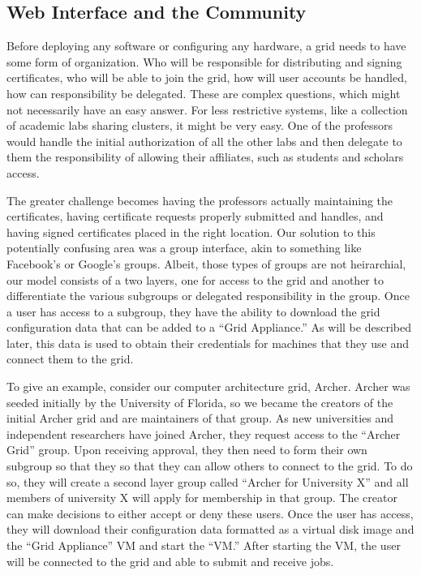 \documentclass[conference]{IEEEtran}
\begin{document}
\subsection{Web Interface and the Community}

Before deploying any software or configuring any hardware, a grid needs to have
some form of organization.  Who will be responsible for distributing and
signing certificates, who will be able to join the grid, how will user accounts
be handled, how can responsibility be delegated.  These are complex questions,
which might not necessarily have an easy answer.  For less restrictive systems,
like a collection of academic labs sharing clusters, it might be very easy.
One of the professors would handle the initial authorization of all the other
labs and then delegate to them the responsibility of allowing their affiliates,
such as students and scholars access.

The greater challenge becomes having the professors actually maintaining the
certificates, having certificate requests properly submitted and handles, and
having signed certificates placed in the right location.  Our solution to this
potentially confusing area was a group interface, akin to something like
Facebook's or Google's groups.  Albeit, those types of groups are not
heirarchial, our model consists of a two layers, one for access to the grid and
another to differentiate the various subgroups or delegated responsibility in
the group.  Once a user has access to a subgroup, they have the ability to
download the grid configuration data that can be added to a ``Grid Appliance.''
As will be described later, this data is used to obtain their credentials for
machines that they use and connect them to the grid.

To give an example, consider our computer architecture grid, Archer.  Archer
was seeded initially by the University of Florida, so we became the creators of
the initial Archer grid and are maintainers of that group.  As new universities
and independent researchers have joined Archer, they request access to the
``Archer Grid'' group.  Upon receiving approval, they then need to form their
own subgroup so that they so that they can allow others to connect to the grid.
To do so, they will create a second layer group called ``Archer for University
X'' and all members of university X will apply for membership in that group.
The creator can make decisions to either accept or deny these users.  Once the
user has access, they will download their configuration data formatted as a
virtual disk image and the ``Grid Appliance'' VM and start the ``VM.''  After
starting the VM, the user will be connected to the grid and able to submit and
receive jobs.
\end{document}
